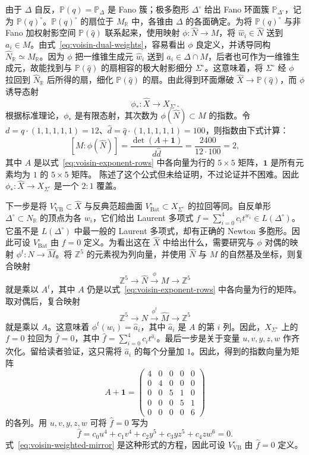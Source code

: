 由于 $\Delta$ 自反，$\mathbb P(q)=\mathbb P_\Delta$ 是 Fano 簇；极多胞形 $\Delta^\circ$ 给出 Fano 环面簇 $\mathbb P_{\Delta^\circ}$，记为 $\mathbb P(q)^\circ$。$\mathbb P(q)^\circ$ 的扇位于 $M_{\mathbb R}$ 中，各锥由 $\Delta$ 的各面确定。为将 $\mathbb P(q)^\circ$ 与非 Fano 加权射影空间 $\mathbb P(\widehat q)$ 联系起来，使用映射 $\phi:\widehat N\to M$，将 $\widehat w_i\in\widehat N$ 送到 $a_i\in M$。由式~\eqref{eq:voisin-dual-weights}，容易看出 $\phi$ 良定义，并诱导同构 $\widehat N_{\mathbb R}\simeq M_{\mathbb R}$。因为 $\phi$ 把一维锥生成元 $\widehat w_i$ 送到 $a_i\in\Delta\cap M$，后者也可作为一维锥生成元，故能找到与 $\mathbb P(\widehat q)$ 的扇相容的极大射影细分 $\Sigma^\circ$。这意味着，将 $\Sigma^\circ$ 经 $\phi$ 拉回到 $\widehat N_{\mathbb R}$ 后所得的扇，细化 $\mathbb P(\widehat q)$ 的扇。由此得到环面爆破 $\widehat X\to\mathbb P(\widehat q)$，而 $\phi$ 诱导态射
\[
\phi_*:\widehat X\longrightarrow X_{\Sigma^\circ}.
\]
根据标准理论，$\phi_*$ 是有限态射，其次数为 $\phi(\widehat N)\subset M$ 的指数。令 $d=q\cdot(1,1,1,1,1)=12$、$\widehat d=\widehat q\cdot(1,1,1,1,1)=100$，则指数由下式计算：
\[
[M:\phi(\widehat N)]
=\frac{\det(A+\mathbf1)}{d\widehat d}
=\frac{2400}{12\cdot100}=2,
\]
其中 $A$ 是以式~\eqref{eq:voisin-exponent-rows} 中各向量为行的 $5\times5$ 矩阵，$\mathbf1$ 是所有元素均为 $1$ 的 $5\times5$ 矩阵。 陈述了这个公式但未给证明，不过论证并不困难。因此 $\phi_*:\widehat X\to X_{\Sigma^\circ}$ 是一个 $2:1$ 覆盖。

下一步是将 $V_{\mathrm{VB}}^\circ\subset\widehat X$ 与反典范超曲面 $V_{\mathrm{Bat}}^\circ\subset X_{\Sigma^\circ}$ 的拉回等同。自反单形 $\Delta^\circ\subset N_{\mathbb R}$ 的顶点为各 $w_i$，它们给出 Laurent 多项式 $f=\sum_{i=0}^4 c_it^{w_i}\in L(\Delta^\circ)$。它虽不是 $L(\Delta^\circ)$ 中最一般的 Laurent 多项式，却有正确的 Newton 多胞形。因此可设 $V_{\mathrm{Bat}}^\circ$ 由 $f=0$ 定义。为看出这在 $\widehat X$ 中给出什么，需要研究与 $\phi$ 对偶的映射 $\phi^t:N\to\widehat M$。将 $\mathbb Z^5$ 的元素视为列向量，并使用 $\widehat N$ 与 $M$ 的自然基及坐标，则复合映射
\[
\mathbb Z^5\longrightarrow\widehat N\xrightarrow{\phi}M
\longrightarrow\mathbb Z^5
\]
就是乘以 $A^t$，其中 $A$ 仍是以式~\eqref{eq:voisin-exponent-rows} 中各向量为行的矩阵。取对偶后，复合映射
\[
\mathbb Z^5\longrightarrow N\xrightarrow{\phi^t}\widehat M
\longrightarrow\mathbb Z^5
\]
就是乘以 $A$。这意味着 $\phi^t(w_i)=\widehat a_i$，其中 $\widehat a_i$ 是 $A$ 的第 $i$ 列。因此，$X_{\Sigma^\circ}$ 上的 $f=0$ 拉回为 $\widehat f=0$，其中 $\widehat f=\sum_{i=0}^4c_it^{\widehat a_i}$。最后一步是关于变量 $u,v,y,z,w$ 作齐次化。留给读者验证，这只需将 $\widehat a_i$ 的每个分量加 $1$。因此，得到的指数向量为矩阵
\[
A+\mathbf1=
\begin{pmatrix}
4&0&0&0&0\\
0&4&0&0&0\\
0&0&5&1&0\\
0&0&0&5&1\\
0&0&0&0&6
\end{pmatrix}
\]
的各列。用 $u,v,y,z,w$ 可将 $\widehat f=0$ 写为
\[
\widehat f=c_0u^4+c_1v^4+c_2y^5+c_3yz^5+c_4zw^6=0.
\]
式~\eqref{eq:voisin-weighted-mirror} 是这种形式的方程，因此可设 $V_{\mathrm{VB}}^\circ$ 由 $\widehat f=0$ 定义。

